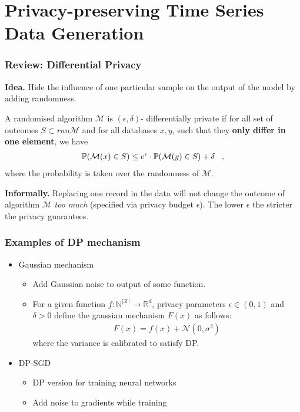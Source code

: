 \section{Privacy-preserving Time Series Data Generation}

\begin{frame}
    \frametitle{Review: Differential Privacy}
    \textbf{Idea.} \alert{Hide the influence} of one particular sample on the output of the model by \alert{adding randomness}.
    \begin{definition}
        A randomised algorithm $\mathcal{M}$ is $(\epsilon, \delta)$- differentially private if for all  set of outcomes $S \subset ran \mathcal{M}$ and for all databases $x,y $, such that they \textbf{only differ in one element}, we have
        \begin{align}
            \mathbb{P}(\mathcal{M}(x) \in S) \le e^\epsilon \cdot \mathbb{P}(\mathcal{M}(y) \in S) + \delta \;\;\;,
        \end{align}
        where the probability is taken over the randomness of $\mathcal{M}$.
    \end{definition}

    \textbf{Informally.} Replacing one record in the data will not change the outcome of algorithm $\mathcal{M}$ \textit{too much} (specified via privacy budget $\epsilon$). The lower $\epsilon$ the stricter the privacy guarantees.

\end{frame}

\begin{frame}
    \frametitle{Examples of DP mechanism}

    \begin{itemize}
        \item Gaussian mechanism
        \begin{itemize}
            \item Add \alert{Gaussian noise} to output of some function.
            \item For a given function  $f:\mathbb{N}^{|\mathcal{X}|} \longrightarrow \mathbb{R}^d$, privacy parameters $\epsilon \in (0,1)$ and $\delta>0$ define the gaussian mechanism $F(x)$ as follows:
            \begin{align}
                F(x) = f(x) + \mathcal{N}(0, \sigma^2)
            \end{align}
            where the variance is calibrated to satisfy DP.
        \end{itemize}
        \item DP-SGD
        \begin{itemize}
            \item DP version for training neural networks
            \item \alert{Add noise to gradients} while training
        \end{itemize}
    \end{itemize}
    

\end{frame}

